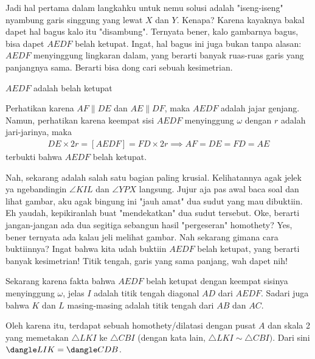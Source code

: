\begin{komentar*}
    Jadi hal pertama dalam langkahku untuk nemu solusi adalah "iseng-iseng" nyambung garis singgung yang lewat $X$ dan $Y$. Kenapa? Karena kayaknya bakal dapet hal bagus kalo itu "disambung". Ternyata bener, kalo gambarnya bagus, bisa dapet $AEDF$ belah ketupat. Ingat, hal bagus ini juga bukan tanpa alasan: $AEDF$ menyinggung lingkaran dalam, yang berarti banyak ruas-ruas garis yang panjangnya sama. Berarti bisa dong cari sebuah kesimetrian.
\end{komentar*}
\begin{lemmarev}
    $AEDF$ adalah belah ketupat
    \begin{buktilemma}
        Perhatikan karena $AF \parallel DE$ dan $AE \parallel DF$, maka $AEDF$ adalah jajar genjang. Namun, perhatikan karena keempat sisi $AEDF$ menyinggung $\omega$ dengan $r$ adalah jari-jarinya, maka
        \begin{align*}
            DE \times 2r = [AEDF] = FD \times 2r \implies AF =DE = FD = AE 
        \end{align*}
        terbukti bahwa $AEDF$ belah ketupat.
    \end{buktilemma}
\end{lemmarev}

\begin{komentar*}
    Nah, sekarang adalah salah satu bagian paling krusial. Kelihatannya agak jelek ya ngebandingin $\angle KIL$ dan $\angle YPX$ langsung. Jujur aja pas awal baca soal dan lihat gambar, aku agak bingung ini "jauh amat" dua sudut yang mau dibuktiin. Eh yaudah, kepikiranlah buat "mendekatkan" dua sudut tersebut. Oke, berarti jangan-jangan ada dua segitiga sebangun hasil "pergeseran" homothety? Yes, bener ternyata ada kalau jeli melihat gambar. Nah sekarang gimana cara buktiinnya? Ingat bahwa kita udah buktiin $AEDF$ belah ketupat, yang berarti banyak kesimetrian! Titik tengah, garis yang sama panjang, wah dapet nih!
\end{komentar*}

Sekarang karena fakta bahwa $AEDF$ belah ketupat dengan keempat sisinya menyinggung $\omega$, jelas $I$ adalah titik tengah diagonal $AD$ dari $AEDF$. Sadari juga bahwa $K$ dan $L$ masing-masing adalah titik tengah dari $AB$ dan $AC$.

Oleh karena itu, terdapat sebuah homothety/dilatasi dengan pusat $A$ dan skala 2 yang memetakan $\triangle LKI$ ke $\triangle CBI$ (dengan kata lain, $\triangle LKI \sim \triangle CBI)$. Dari sini $\dangle LIK = \dangle CDB$. 

